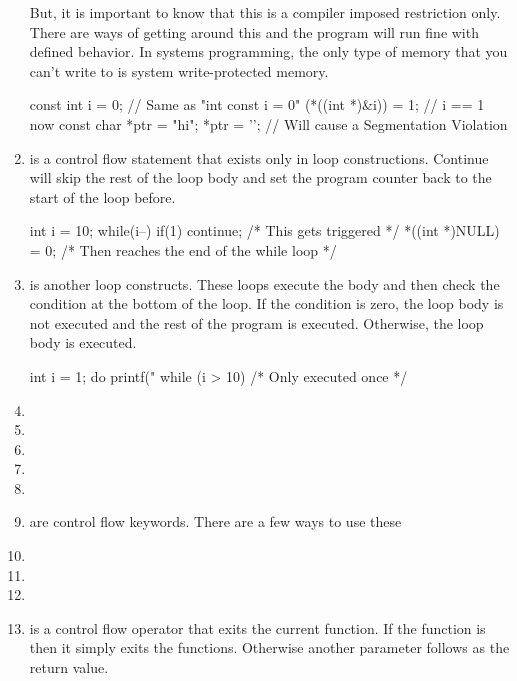\begin{enumerate}
But, it is important to know that this is a compiler imposed restriction only. There are ways of getting around this and the program will run fine with defined behavior. In systems programming, the only type of memory that you can't write to is system write-protected memory.

\begin{code}[language=C]
const int i = 0; // Same as "int const i = 0"
(*((int *)&i)) = 1; // i == 1 now
const char *ptr = "hi";
*ptr = '\0'; // Will cause a Segmentation Violation
\end{code}

\item {} is a control flow statement that exists only in loop constructions. Continue will skip the rest of the loop body and set the program counter back to the start of the loop before.

\begin{code}[language=C]
int i = 10;
while(i--) {
  if(1) continue; /* This gets triggered */
  *((int *)NULL) = 0;
} /* Then reaches the end of the while loop */
\end{code}

\item {} is another loop constructs. These loops execute the body and then check the condition at the bottom of the loop. If the condition is zero, the loop body is not executed and the rest of the program is executed. Otherwise, the loop body is executed.

\begin{code}[language=C]
int i = 1;
do {
  printf("%
} while (i > 10) /* Only executed once */
\end{code}

\item {}
\item {}
\item {}
\item {}
\item {}
\item {} are control flow keywords. There are a few ways to use these
\item {}
\item {}
\item {}
\item {} is a control flow operator that exits the current function. If the function is  then it simply exits the functions. Otherwise another parameter follows as the return value.


\end{enumerate}
